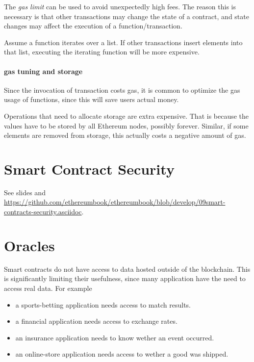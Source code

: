 \begin{note}
The \emph{gas limit} can be used to avoid unexpectedly high fees. 
The reason this is necessary is that other transactions may change the state of a contract, and state changes may affect the execution of a function/transaction.
\end{note}

\begin{example}
Assume a function iterates over a list. If other transactions insert elements into that list, executing the iterating function will be more expensive.
\end{example}

\paragraph{gas tuning and storage}
Since the invocation of transaction costs gas, it is common to optimize the gas usage of functions, since this will save users actual money.

Operations that need to allocate storage are extra expensive. 
That is because the values have to be stored by all Ethereum nodes, possibly forever.
Similar, if some elements are removed from storage, this actually costs a negative amount of gas.

\section{Smart Contract Security}
	See slides and \url{https://github.com/ethereumbook/ethereumbook/blob/develop/09smart-contracts-security.asciidoc}.
	
\section{Oracles}
Smart contracts do not have access to data hosted outside of the blockchain. 
This is significantly limiting their usefulness, since many application have the need to access real data.
For example
\begin{itemize}
	\item a sports-betting application needs access to match results.
	\item a financial application needs access to exchange rates.
	\item an insurance application needs to know wether an event occurred.
	\item an online-store application needs access to wether a good was shipped.
\end{itemize}

